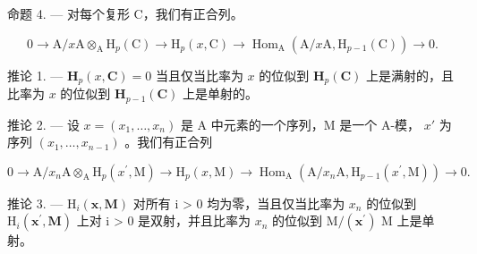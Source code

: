 命题 4. --- 对每个复形 C，我们有正合列。

\[
0 \rightarrow \mathrm{A} / x \mathrm{A} \otimes_ {\mathrm{A}} \mathrm{H} _ {p} (\mathrm{C}) \rightarrow \mathrm{H} _ {p} (x, \mathrm{C}) \rightarrow \operatorname{Hom} _ {\mathrm{A}} (\mathrm{A} / x \mathrm{A}, \mathrm{H} _ {p - 1} (\mathrm{C})) \rightarrow 0.
\]

推论 1. --- \(\mathbf{H}_{p}(x,\mathbf{C})=0\) 当且仅当比率为 \(x\) 的位似到 \(\mathbf{H}_{p}(\mathbf{C})\) 上是满射的，且比率为 \(x\) 的位似到 \(\mathbf{H}_{p-1}(\mathbf{C})\) 上是单射的。

推论 2. --- 设 \(x = (x_1, \ldots, x_n)\) 是 A 中元素的一个序列，M 是一个 A-模， \(x'\) 为序列 \((x_1, \ldots, x_{n-1})\) 。我们有正合列

\[
0 \rightarrow \mathrm{A} / x _ {n} \mathrm{A} \otimes_ {\mathrm{A}} \mathrm{H} _ {p} (x ^ {\prime}, \mathrm{M}) \rightarrow \mathrm{H} _ {p} (x, \mathrm{M}) \rightarrow \operatorname{Hom} _ {\mathrm{A}} (\mathrm{A} / x _ {n} \mathrm{A}, \mathrm{H} _ {p - 1} (x ^ {\prime}, \mathrm{M})) \rightarrow 0.
\]

推论 3. --- \(\mathrm{H}_{i}(\mathbf{x},\mathbf{M})\) 对所有 i \textgreater{} 0 均为零，当且仅当比率为 \(x_{n}\) 的位似到 \(\mathrm{H}_{i}(\mathbf{x}^{\prime},\mathbf{M})\) 上对 i \textgreater{} 0 是双射，并且比率为 \(x_{n}\) 的位似到 \(\mathrm{M}/(\mathbf{x}^{\prime})\) M 上是单射。

